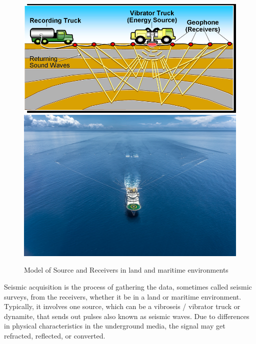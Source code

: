 \begin{figure}[ht]
	\centering
	\includegraphics[width=0.39\textheight]{Images/SeismicChes5.jpg}
	\includegraphics[width=0.3\textheight]{Images/2562_geo_coral_large.jpg}
	\caption{Model of Source and Receivers in land and maritime environments}
	\label{fig:Seismic-Acquisition}
\end{figure}

Seismic acquisition is the process of gathering the data, sometimes called seismic surveys, from the receivers, whether it be in a land or maritime environment. Typically, it involves one source, which can be a vibroseis / vibrator truck or dynamite, that sends out pulses also known as seismic waves. Due to differences in physical characteristics in the underground media, the signal may get refracted, reflected, or converted. 

